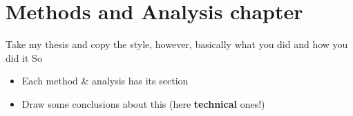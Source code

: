 \chapter{Methods and Analysis chapter}
Take my thesis and copy the style, however, basically what you did and how you did it 
So 
\begin{itemize}
    \item Each method \& analysis has its section
    \item Draw some conclusions about this (here \textbf{technical} ones!)
\end{itemize}

